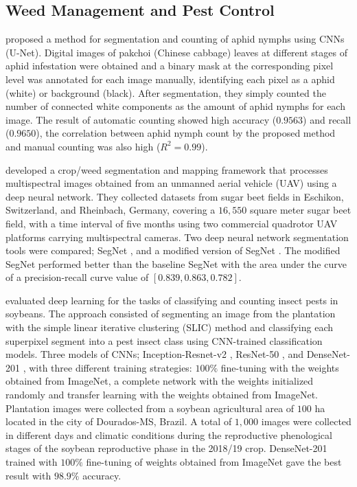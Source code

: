 \documentclass[12pt]{report}
\numberwithin{equation}{section}
\begin{document}
\subsection{Weed Management and Pest Control}
{\cite{chen2018automatic}} proposed a method for segmentation and counting of aphid nymphs using CNNs (U-Net). Digital images of {pakchoi} (Chinese cabbage) leaves at different stages of aphid infestation were obtained and a binary mask at the corresponding pixel level was annotated for each image manually, identifying each pixel as a aphid (white) or background (black). After segmentation, they simply counted the number of connected white components as the amount of aphid nymphs for each image. The result of automatic counting showed high accuracy ($0.9563$) and recall ($0.9650$), the correlation between aphid nymph count by the proposed method and manual counting was also high ($R^2 = 0.99$). 

{\cite{sa2018weedmap}} developed a crop/weed segmentation and
mapping framework that processes multispectral images obtained from an unmanned aerial vehicle (UAV) using a deep neural network. They collected datasets from sugar beet fields in Eschikon, Switzerland, and Rheinbach, Germany, covering a $16,550$ square meter sugar beet field, with a time interval of five months using two commercial quadrotor UAV platforms carrying multispectral cameras. Two deep neural network segmentation tools were compared; SegNet {\cite{garcia2017review}}, and a modified version of  SegNet {\cite{badrinarayanan2017segnet}}. The modified SegNet performed better than the baseline SegNet with  the area under the curve  of a precision-recall curve value of $[0.839, 0.863, 0.782]$.

{\cite{tetila2019deep}} evaluated deep learning for the tasks of classifying and counting insect pests in soybeans. The approach consisted of segmenting an image from the plantation with the simple linear iterative clustering (SLIC) method and classifying each superpixel segment into a pest insect class  using CNN-trained classification models. Three models of CNNs; Inception-Resnet-v2 {\cite{Szegedy}}, ResNet-50 {\cite{He2015DeepRL}}, and DenseNet-201 {\cite{huang2017densely}}, with three different training strategies: $100\%$ fine-tuning with the weights obtained from ImageNet, a complete network with the weights initialized randomly and transfer learning with the weights obtained from ImageNet. Plantation images were collected from a soybean agricultural area of $100$ ha located in the city of Dourados-MS, Brazil. A total of $1,000$ images were collected in different days and climatic conditions  during the reproductive phenological stages  of the soybean reproductive phase in the 2018/19 crop. DenseNet-201 trained with $100\%$ fine-tuning of weights obtained from ImageNet gave the best result with $98.9\%$ accuracy.
\end{document}

